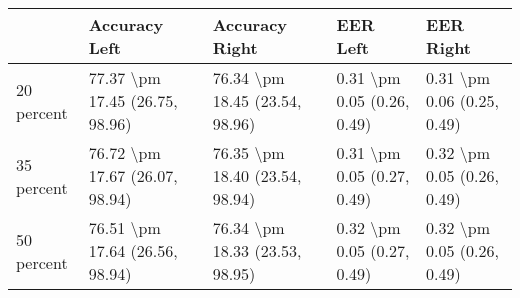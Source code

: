\begin{tabular}{lllll}
\toprule
{} &                   Accuracy Left &                  Accuracy Right &                    EER Left &                   EER Right \\
\midrule
20 percent &  77.37 \textbackslash pm 17.45 (26.75, 98.96) &  76.34 \textbackslash pm 18.45 (23.54, 98.96) &  0.31 \textbackslash pm 0.05 (0.26, 0.49) &  0.31 \textbackslash pm 0.06 (0.25, 0.49) \\
35 percent &  76.72 \textbackslash pm 17.67 (26.07, 98.94) &  76.35 \textbackslash pm 18.40 (23.54, 98.94) &  0.31 \textbackslash pm 0.05 (0.27, 0.49) &  0.32 \textbackslash pm 0.05 (0.26, 0.49) \\
50 percent &  76.51 \textbackslash pm 17.64 (26.56, 98.94) &  76.34 \textbackslash pm 18.33 (23.53, 98.95) &  0.32 \textbackslash pm 0.05 (0.27, 0.49) &  0.32 \textbackslash pm 0.05 (0.26, 0.49) \\
\bottomrule
\end{tabular}
